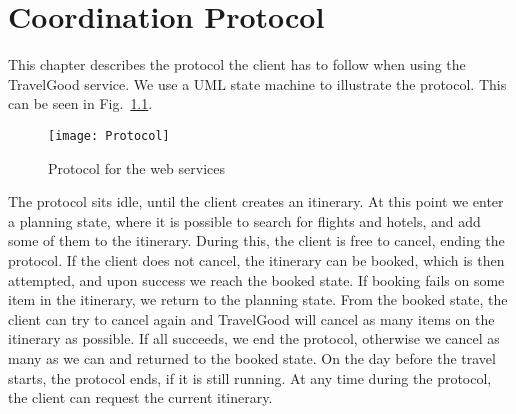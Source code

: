\chapter{Coordination Protocol}
This chapter describes the protocol the client has to follow when using the TravelGood service. We use a UML state machine to illustrate the protocol. This can be seen in Fig.~\ref{fig:protocol}.

\begin{figure}[H]
\centering
\texttt{[image: Protocol]}
\caption{Protocol for the web services}
\label{fig:protocol}
\end{figure}

 The protocol sits idle, until the client creates an itinerary. At this point we enter a planning state, where it is possible to search for flights and hotels, and add some of them to the itinerary. During this, the client is free to cancel, ending the protocol. If the client does not cancel, the itinerary can be booked, which is then attempted, and upon success we reach the booked state. If booking fails on some item in the itinerary, we return to the planning state. From the booked state, the client can try to cancel again and TravelGood will cancel as many items on the itinerary as possible. If all succeeds, we end the protocol, otherwise we cancel as many as we can and returned to the booked state. On the day before the travel starts, the protocol ends, if it is still running. At any time during the protocol, the client can request the current itinerary.